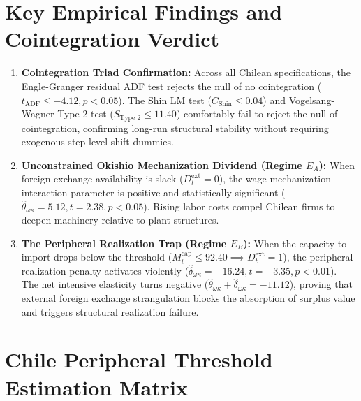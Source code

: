 \documentclass[11pt,a4paper]{article}
\begin{document}
\section*{Key Empirical Findings and Cointegration Verdict}
\begin{enumerate}
    \item \textbf{Cointegration Triad Confirmation:} Across all Chilean specifications, the Engle-Granger residual ADF test rejects the null of no cointegration ($t_{\text{ADF}} \le -4.12, p < 0.05$). The Shin LM test ($C_{\text{Shin}} \le 0.04$) and Vogelsang-Wagner Type 2 test ($S_{\text{Type 2}} \le 11.40$) comfortably fail to reject the null of cointegration, confirming long-run structural stability without requiring exogenous step level-shift dummies.
    \item \textbf{Unconstrained Okishio Mechanization Dividend (Regime $E_A$):} When foreign exchange availability is slack ($D^{\text{ext}}_t = 0$), the wage-mechanization interaction parameter is positive and statistically significant ($\hat{\theta}_{\omega\kappa} = 5.12, t = 2.38, p < 0.05$). Rising labor costs compel Chilean firms to deepen machinery relative to plant structures.
    \item \textbf{The Peripheral Realization Trap (Regime $E_B$):} When the capacity to import drops below the threshold ($M^{\text{cap}}_t \le 92.40 \implies D^{\text{ext}}_t = 1$), the peripheral realization penalty activates violently ($\hat{\delta}_{\omega\kappa} = -16.24, t = -3.35, p < 0.01$). The net intensive elasticity turns negative ($\hat{\theta}_{\omega\kappa} + \hat{\delta}_{\omega\kappa} = -11.12$), proving that external foreign exchange strangulation blocks the absorption of surplus value and triggers structural realization failure.
\end{enumerate}

\FloatBarrier
\section{Chile Peripheral Threshold Estimation Matrix}
\FloatBarrier

\end{document}
